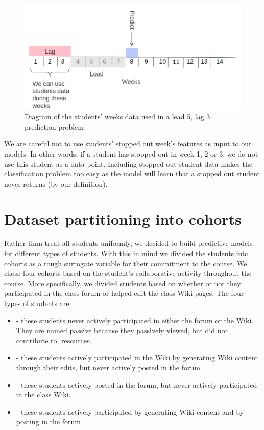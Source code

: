 \begin{figure}[!ht]
  \caption{Diagram of the students' weeks data used in a lead 5, lag 3 prediction problem}\label{fig:lead_lag}
  \centering
    \includegraphics[width=1.0\textwidth]{figures/lead_lag.png}
\end{figure}

We are careful not to use students' stopped out week's features as input to our models. In other words, if a student has stopped out in week 1, 2 or 3, we do not use this student as a data point. Including stopped out student data makes the classification problem too easy as the model will learn that a stopped out student never returns (by our \sti definition).

\section{Dataset partitioning into cohorts}
Rather than treat all students uniformly, we decided to build predictive models for different types of students. With this in mind we divided the students into cohorts as a rough surrogate variable for their commitment to the course. We chose four cohorts based on the student’s collaborative activity throughout the course. More specifically, we divided students based on whether or not they participated in the class forum or helped edit the class Wiki pages. The four types of students are:

\begin{itemize}
\item \neither - these students never actively participated in either the forum or the Wiki. They are named passive because they passively viewed, but did not contribute to, resources.
\item \wiki - these students actively participated in the Wiki by generating Wiki content through their edits, but never actively posted in the forum.
\item \forum - these students actively posted in the forum, but never actively participated in the class Wiki.
\item \both - these students actively participated by generating Wiki content and by posting in the forum
\end{itemize}

